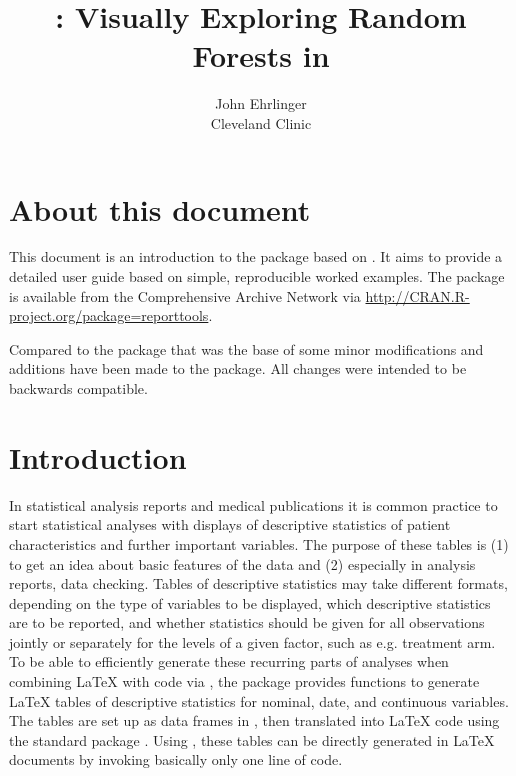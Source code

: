 \documentclass[nojss]{jss}
\author{John Ehrlinger\\Cleveland Clinic} %
\title{{\pkg{ggRandomForests}}: Visually Exploring Random Forests in \proglang{R}}
\begin{document}



\section{About this document}
This document is an introduction to the  package
 \citep{reporttools} based on \citet{Rufibach:2009}. It aims to provide a detailed user guide 
based on simple, reproducible worked examples. The  package is available from the
Comprehensive  Archive Network via \url{http://CRAN.R-project.org/package=reporttools}.

Compared to the package that was the base of \citet{Rufibach:2009} some minor modifications and additions 
have been made to the package. All changes were intended to be backwards compatible.


\section{Introduction}
In statistical analysis reports and medical publications it is common practice to start statistical analyses with 
displays of descriptive statistics of patient characteristics and further important variables. 
The purpose of these tables is (1) to get an idea about basic features of the data and (2) especially in 
analysis reports, data checking.
Tables of descriptive statistics may take different formats, depending on the type of 
variables to be displayed, which descriptive statistics are to be reported, and whether statistics should be given
for all observations jointly or separately for the levels of a given factor, such as e.g. treatment arm. 
To be able to efficiently generate these recurring parts of analyses when combining {\LaTeX}
\citep{knuth_84, lamport_94} with  \citep{R} code via  \citep{leisch_02}, the  package  
provides functions to generate {\LaTeX} tables of descriptive statistics for nominal, date,
and continuous variables.
The tables are set up as data frames in , then translated into {\LaTeX} code
using the standard  package  \citep{xtable}. Using , these tables can be directly generated
in {\LaTeX} documents by invoking basically only one line of  code.
\end{document}
